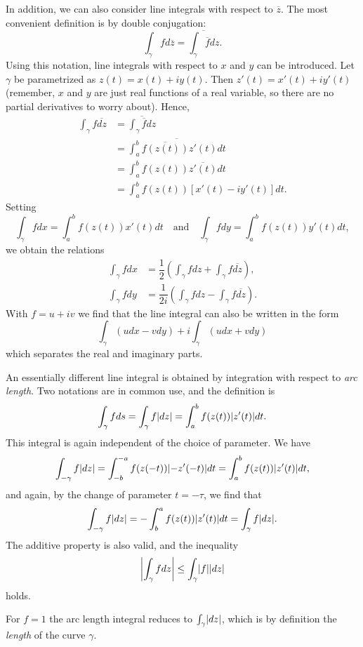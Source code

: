 In addition, we can also consider line integrals with respect to $\overline{z}$. The most convenient definition is by double conjugation: $$\int_{\gamma} f d\overline{z}=\overline{\int_{\gamma} \overline{f} dz}.$$ Using this notation, line integrals with respect to $x$ and $y$ can be introduced. Let $\gamma$ be parametrized as $z(t)=x(t)+iy(t)$. Then $z'(t)=x'(t)+iy'(t)$ (remember, $x$ and $y$ are just real functions of a real variable, so there are no partial derivatives to worry about). Hence,
\begin{align*}
\int_{\gamma} f \overline{dz} &=\overline{\int_{\gamma} \overline{f} dz} \\
&=\overline{\int_{a}^{b} \overline{f(z(t))} z'(t) dt} \\
&=\int_{a}^{b} f(z(t)) \overline{z'(t)} dt \\
&=\int_{a}^{b} f(z(t)) \left[x'(t)-iy'(t)\right]dt.
\end{align*}
Setting $$\int_{\gamma} fdx=\int_{a}^{b}f(z(t))x'(t)dt \quad \text{and} \quad \int_{\gamma} fdy=\int_{a}^{b}f(z(t))y'(t)dt,$$ we obtain the relations
\begin{align*}
\int_{\gamma} f dx &=\dfrac{1}{2}\left(\int_{\gamma} f dz + \int_{\gamma} f \overline{dz}\right), \\
\int_{\gamma} f dy &=\dfrac{1}{2i}\left(\int_{\gamma} f dz - \int_{\gamma} f \overline{dz}\right).
\end{align*}
With $f=u+iv$ we find that the line integral can also be written in the form $$\int_{\gamma} (u dx-v dy)+i\int_{\gamma} (u dx+v dy)$$ which separates the real and imaginary parts.

An essentially different line integral is obtained by integration with respect to \emph{arc length}. Two notations are in common use, and the definition is $$\int_{\gamma} f ds=\int_{\gamma} f \lvert dz \rvert=\int_{a}^{b} f(z(t)) \lvert z'(t) \rvert dt.$$ This integral is again independent of the choice of parameter. We have $$\int_{-\gamma} f \lvert dz \rvert=\int_{-b}^{-a} f(z(-t)) \lvert -z'(-t) \rvert dt=\int_{a}^{b} f(z(t)) \lvert z'(t) \rvert dt,$$ and again, by the change of parameter $t=-\tau$, we find that $$\int_{-\gamma}f\lvert dz \rvert=-\int_{b}^{a} f(z(t)) \lvert z'(t) \rvert dt=\int_{\gamma} f \lvert dz \rvert.$$ The additive property is also valid, and the inequality $$\left\lvert \int_{\gamma} f dz\right \rvert\le \int_{\gamma} \lvert f \rvert \lvert dz \rvert$$ holds.

For $f=1$ the arc length integral reduces to $\int_{\gamma} \lvert dz \rvert$, which is by definition the \emph{length} of the curve $\gamma$.

